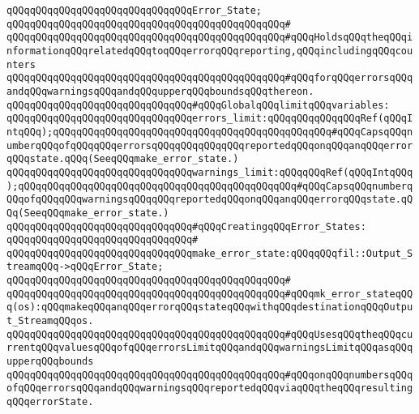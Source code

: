 \verb|qQQqqQQqqQQqqQQqqQQqqQQqqQQqqQQqError_State;|\newline
\verb|qQQqqQQqqQQqqQQqqQQqqQQqqQQqqQQqqQQqqQQqqQQqqQQq#|\newline
\verb|qQQqqQQqqQQqqQQqqQQqqQQqqQQqqQQqqQQqqQQqqQQqqQQq#qQQqHoldsqQQqtheqQQqinformationqQQqrelatedqQQqtoqQQqerrorqQQqreporting,qQQqincludingqQQqcounters|\newline
\verb|qQQqqQQqqQQqqQQqqQQqqQQqqQQqqQQqqQQqqQQqqQQqqQQq#qQQqforqQQqerrorsqQQqandqQQqwarningsqQQqandqQQqupperqQQqboundsqQQqthereon.|\newline
\newline
\newline
\newline
\verb|qQQqqQQqqQQqqQQqqQQqqQQqqQQqqQQq#qQQqGlobalqQQqlimitqQQqvariables:|\newline
\newline
\verb|qQQqqQQqqQQqqQQqqQQqqQQqqQQqqQQqerrors_limit:qQQqqQQqqQQqqQQqRef(qQQqIntqQQq);qQQqqQQqqQQqqQQqqQQqqQQqqQQqqQQqqQQqqQQqqQQqqQQq#qQQqCapsqQQqnumberqQQqofqQQqqQQqerrorsqQQqqQQqqQQqqQQqreportedqQQqonqQQqanqQQqerrorqQQqstate.qQQq(SeeqQQqmake_error_state.)|\newline
\verb|qQQqqQQqqQQqqQQqqQQqqQQqqQQqqQQqwarnings_limit:qQQqqQQqRef(qQQqIntqQQq);qQQqqQQqqQQqqQQqqQQqqQQqqQQqqQQqqQQqqQQqqQQqqQQq#qQQqCapsqQQqnumberqQQqofqQQqqQQqwarningsqQQqqQQqreportedqQQqonqQQqanqQQqerrorqQQqstate.qQQq(SeeqQQqmake_error_state.)|\newline
\newline
\newline
\newline
\verb|qQQqqQQqqQQqqQQqqQQqqQQqqQQqqQQq#qQQqCreatingqQQqError_States:|\newline
\verb|qQQqqQQqqQQqqQQqqQQqqQQqqQQqqQQq#|\newline
\verb|qQQqqQQqqQQqqQQqqQQqqQQqqQQqqQQqmake_error_state:qQQqqQQqfil::Output_StreamqQQq->qQQqError_State;|\newline
\verb|qQQqqQQqqQQqqQQqqQQqqQQqqQQqqQQqqQQqqQQqqQQqqQQq#|\newline
\verb|qQQqqQQqqQQqqQQqqQQqqQQqqQQqqQQqqQQqqQQqqQQqqQQq#qQQqmk_error_stateqQQq(os):qQQqmakeqQQqanqQQqerrorqQQqstateqQQqwithqQQqdestinationqQQqOutput_StreamqQQqos.|\newline
\verb|qQQqqQQqqQQqqQQqqQQqqQQqqQQqqQQqqQQqqQQqqQQqqQQq#qQQqUsesqQQqtheqQQqcurrentqQQqvaluesqQQqofqQQqerrorsLimitqQQqandqQQqwarningsLimitqQQqasqQQqupperqQQqbounds|\newline
\verb|qQQqqQQqqQQqqQQqqQQqqQQqqQQqqQQqqQQqqQQqqQQqqQQq#qQQqonqQQqnumbersqQQqofqQQqerrorsqQQqandqQQqwarningsqQQqreportedqQQqviaqQQqtheqQQqresultingqQQqerrorState.|\newline
